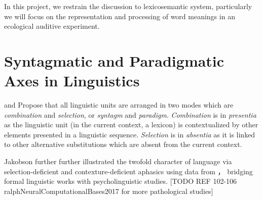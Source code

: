 
In this project, we restrain the discussion to lexicosemantic system, particularly we will focus on the representation and processing of word meanings in an ecological auditive experiment. 

\section{Syntagmatic and Paradigmatic Axes in Linguistics}

\cite{jakobsonFundamentalsLanguage1963} and \cite{desaussureCoursLinguistiqueGenerale1969} Propose that all linguistic units are arranged in two modes which are \emph{combination} and \emph{selection}, or \emph{syntagm} and \emph{paradigm}. \emph{Combination} is in \emph{presentia} as the linguistic unit (in the current context, a lexicon) is contextualized by other elements presented in a linguistic sequence. \emph{Selection} is in \emph{absentia} as it is linked to other alternative substitutions which are absent from the current context. 

Jakobson further further illustrated the twofold character of language via selection-deficient and contexture-deficient aphasics using data from \cite{goldsteinLanguageLanguageDisturbances1948, headAphasiaKindredDisorders1920, hughlingsjacksonAffectionsSpeechDisease1879}， bridging formal linguistic works with psycholinguistic studies.  [TODO REF 102-106 ralphNeuralComputationalBases2017 for more pathological studies]

